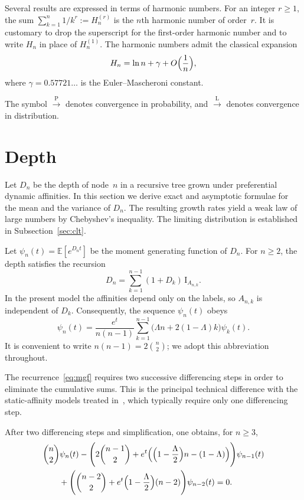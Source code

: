 \documentclass[11pt]{article}
\theoremstyle{remark}
\newcommand{\E}{\mathbb{E}}
\newcommand{\I}{\mathrm{I}}
\newcommand{\llaw}{\xrightarrow{\mathrm{L}}}
\newcommand{\plaw}{\xrightarrow{\mathrm{P}}}
\begin{document}
Several results are expressed in terms of harmonic numbers. For an integer
\(r\ge 1\), the sum \(\sum_{k=1}^n 1/k^r:=H_n^{(r)}\) is the \(n\)th harmonic
number of order~$r$. It is customary to drop the superscript for the first-order
harmonic number and to write \(H_n\) in place of \(H_n^{(1)}\). The harmonic
numbers admit the classical expansion
\begin{equation}
H_n=\ln n+\gamma+O\Bigl(\frac1n\Bigr),
\label{eq:harmonic}
\end{equation}
where \(\gamma=0.57721\ldots\) is the Euler--Mascheroni constant.

The symbol \(\plaw\) denotes convergence in probability, and \(\llaw\) denotes
convergence in distribution.

\section{Depth}

Let \(D_n\) be the depth of node~$n$ in a recursive tree grown under preferential
dynamic affinities. In this section we derive exact and asymptotic formulae for
the mean and the variance of \(D_n\). The resulting growth rates yield a weak law
of large numbers by Chebyshev's inequality. The limiting distribution is
established in Subsection~\ref{sec:clt}.

Let \(\psi_n(t)=\E[e^{D_n t}]\) be the moment generating function of \(D_n\).
For \(n\ge 2\), the depth satisfies the recursion
\begin{equation}
D_n=\sum_{k=1}^{n-1}(1+D_k)\,\I_{A_{n,k}}.
\label{eq:depth-rec}
\end{equation}
In the present model the affinities depend only on the labels, so \(A_{n,k}\) is
independent of \(D_k\). Consequently, the sequence \(\psi_n(t)\) obeys
\begin{equation}
\psi_n(t)
=\frac{e^t}{n(n-1)}
\sum_{k=1}^{n-1}\bigl(\Lambda n+2(1-\Lambda)k\bigr)\psi_k(t).
\label{eq:mgf}
\end{equation}
It is convenient to write \(n(n-1)=2\binom{n}{2}\); we adopt this abbreviation
throughout.

The recurrence~\eqref{eq:mgf} requires two successive differencing steps in order
to eliminate the cumulative sums. This is the principal technical difference with
the static-affinity models treated in~\citep{nakata2024}, which typically require
only one differencing step.

After two differencing steps and simplification, one obtains, for \(n\ge 3\),
\begin{align}
&\binom{n}{2}\psi_n(t)
-\Biggl(2\binom{n-1}{2}
+e^t\Bigl(\Bigl(1-\frac{\Lambda}{2}\Bigr)n-(1-\Lambda)\Bigr)\Biggr)\psi_{n-1}(t)
\nonumber\\
&\qquad
+\Biggl(\binom{n-2}{2}
+e^t\Bigl(1-\frac{\Lambda}{2}\Bigr)(n-2)\Biggr)\psi_{n-2}(t)
=0.
\label{eq:mgf-diff}
\end{align}
\end{document}
